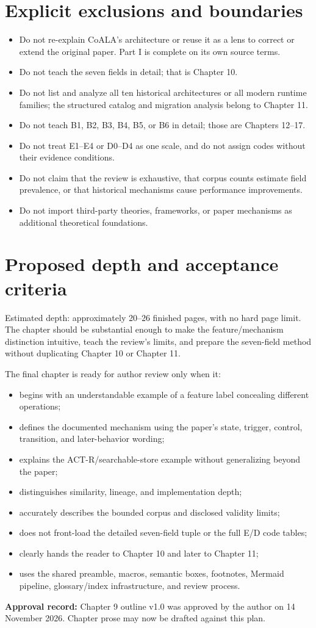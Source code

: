 \section{Explicit exclusions and boundaries}
\begin{itemize}
  \item Do not re-explain CoALA's architecture or reuse it as a lens to correct or extend the original paper. Part I is complete on its own source terms.
  \item Do not teach the seven fields in detail; that is Chapter 10.
  \item Do not list and analyze all ten historical architectures or all modern runtime families; the structured catalog and migration analysis belong to Chapter 11.
  \item Do not teach B1, B2, B3, B4, B5, or B6 in detail; those are Chapters 12--17.
  \item Do not treat E1--E4 or D0--D4 as one scale, and do not assign codes without their evidence conditions.
  \item Do not claim that the review is exhaustive, that corpus counts estimate field prevalence, or that historical mechanisms cause performance improvements.
  \item Do not import third-party theories, frameworks, or paper mechanisms as additional theoretical foundations.
\end{itemize}

\section{Proposed depth and acceptance criteria}
Estimated depth: approximately 20--26 finished pages, with no hard page limit. The chapter should be substantial enough to make the feature/mechanism distinction intuitive, teach the review's limits, and prepare the seven-field method without duplicating Chapter 10 or Chapter 11.

The final chapter is ready for author review only when it:
\begin{itemize}
  \item begins with an understandable example of a feature label concealing different operations;
  \item defines the documented mechanism using the paper's state, trigger, control, transition, and later-behavior wording;
  \item explains the ACT-R/searchable-store example without generalizing beyond the paper;
  \item distinguishes similarity, lineage, and implementation depth;
  \item accurately describes the bounded corpus and disclosed validity limits;
  \item does not front-load the detailed seven-field tuple or the full E/D code tables;
  \item clearly hands the reader to Chapter 10 and later to Chapter 11;
  \item uses the shared preamble, macros, semantic boxes, footnotes, Mermaid pipeline, glossary/index infrastructure, and review process.
\end{itemize}

\noindent\textbf{Approval record:} Chapter 9 outline v1.0 was approved by the author on 14 November 2026. Chapter prose may now be drafted against this plan.


